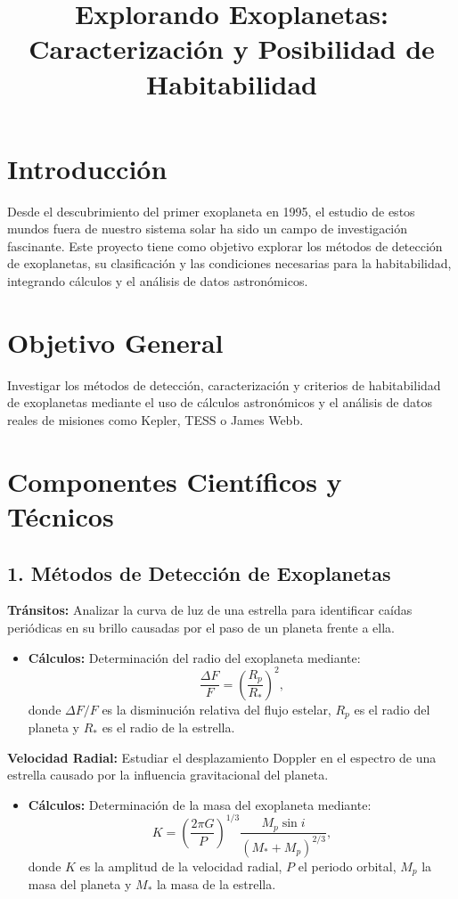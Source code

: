 \documentclass[12pt]{article}
\title{Explorando Exoplanetas: Caracterizaci\'on y Posibilidad de Habitabilidad}
\author{}
\date{}
\begin{document}
\maketitle

\section*{Introducci\'on}
Desde el descubrimiento del primer exoplaneta en 1995, el estudio de estos mundos fuera de nuestro sistema solar ha sido un campo de investigaci\'on fascinante. Este proyecto tiene como objetivo explorar los m\'etodos de detecci\'on de exoplanetas, su clasificaci\'on y las condiciones necesarias para la habitabilidad, integrando c\'alculos y el an\'alisis de datos astron\'omicos.

\section*{Objetivo General}
Investigar los m\'etodos de detecci\'on, caracterizaci\'on y criterios de habitabilidad de exoplanetas mediante el uso de c\'alculos astron\'omicos y el an\'alisis de datos reales de misiones como Kepler, TESS o James Webb.

\section*{Componentes Cient\'ificos y T\'ecnicos}

\subsection*{1. M\'etodos de Detecci\'on de Exoplanetas}
\textbf{Tr\'ansitos:} Analizar la curva de luz de una estrella para identificar ca\'idas peri\'odicas en su brillo causadas por el paso de un planeta frente a ella.
\begin{itemize}
    \item \textbf{C\'alculos:} Determinaci\'on del radio del exoplaneta mediante:
    \begin{equation}
        \frac{\Delta F}{F} = \left(\frac{R_p}{R_*}\right)^2,
    \end{equation}
    donde $\Delta F/F$ es la disminuci\'on relativa del flujo estelar, $R_p$ es el radio del planeta y $R_*$ es el radio de la estrella.
\end{itemize}

\textbf{Velocidad Radial:} Estudiar el desplazamiento Doppler en el espectro de una estrella causado por la influencia gravitacional del planeta.
\begin{itemize}
    \item \textbf{C\'alculos:} Determinaci\'on de la masa del exoplaneta mediante:
    \begin{equation}
        K = \left(\frac{2 \pi G}{P}\right)^{1/3} \frac{M_p \sin i}{(M_* + M_p)^{2/3}},
    \end{equation}
    donde $K$ es la amplitud de la velocidad radial, $P$ el periodo orbital, $M_p$ la masa del planeta y $M_*$ la masa de la estrella.
\end{itemize}
\end{document}
